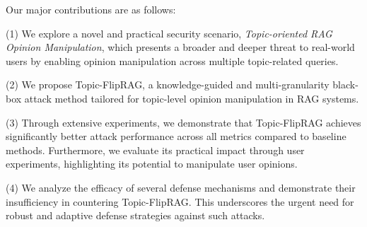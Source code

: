 Our major contributions are as follows:

(1) We explore a novel and practical security scenario, \textit{Topic-oriented RAG Opinion Manipulation}, which presents a broader and deeper threat to real-world users by enabling opinion manipulation across multiple topic-related queries.

(2) We propose Topic-FlipRAG, a knowledge-guided and multi-granularity black-box attack method tailored for topic-level opinion manipulation in RAG systems.

(3) Through extensive experiments, we demonstrate that Topic-FlipRAG achieves significantly better attack performance across all metrics compared to baseline methods. Furthermore, we evaluate its practical impact through user experiments, highlighting its potential to manipulate user opinions.

(4) We analyze the efficacy of several defense mechanisms and demonstrate their insufficiency in countering Topic-FlipRAG. This underscores the urgent need for robust and adaptive defense strategies against such attacks.

